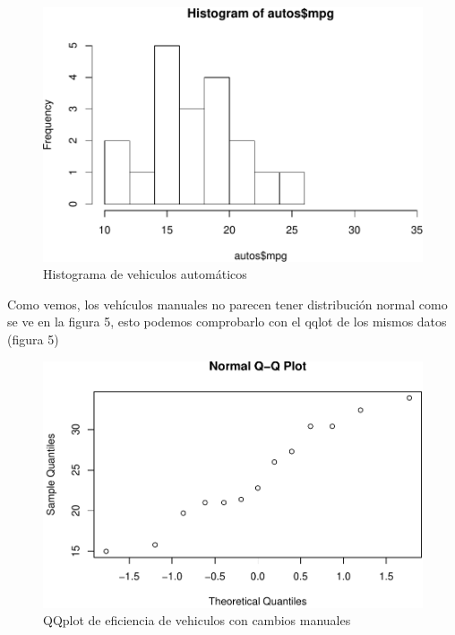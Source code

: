 \documentclass[]{article}
\newenvironment{Shaded}{\begin{snugshade}}{\end{snugshade}}
\newcommand{\KeywordTok}[1]{\textcolor[rgb]{0.13,0.29,0.53}{\textbf{#1}}}
\newcommand{\OperatorTok}[1]{\textcolor[rgb]{0.81,0.36,0.00}{\textbf{#1}}}
\newcommand{\NormalTok}[1]{#1}
\begin{document}
\begin{figure}
\centering
\includegraphics{Guia5_files/figure-latex/unnamed-chunk-10-1.pdf}
\caption{Histograma de vehiculos automáticos}
\end{figure}

Como vemos, los vehículos manuales no parecen tener distribución normal
como se ve en la figura 5, esto podemos comprobarlo con el qqlot de los
mismos datos (figura 5)

\begin{Shaded}
\end{Shaded}

\begin{figure}
\centering
\includegraphics{Guia5_files/figure-latex/unnamed-chunk-11-1.pdf}
\caption{QQplot de eficiencia de vehiculos con cambios manuales}
\end{figure}
\end{document}

